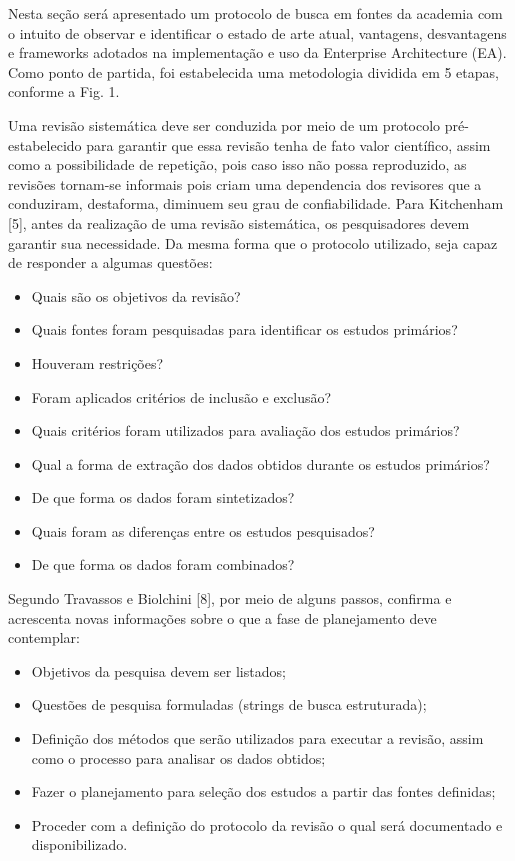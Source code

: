 Nesta seção será apresentado um protocolo de busca em fontes da academia com o intuito de observar e identificar o estado de arte atual, vantagens, desvantagens e frameworks adotados na implementação e uso da Enterprise Architecture (EA). Como ponto de partida, foi estabelecida uma metodologia dividida em 5 etapas, conforme a Fig. 1.


Uma revisão sistemática deve ser conduzida por meio de um protocolo pré-estabelecido para garantir que essa revisão tenha de fato valor científico, assim como a possibilidade de repetição, pois caso isso não possa reproduzido, as revisões tornam-se informais pois criam uma dependencia dos revisores que a conduziram, destaforma, diminuem seu grau de confiabilidade.
Para Kitchenham [5], antes da realização de uma revisão sistemática, os pesquisadores devem garantir sua necessidade. Da mesma forma que o protocolo utilizado, seja capaz de responder a algumas questões:

\begin{itemize}
    \item Quais são os objetivos da revisão?
    \item Quais fontes foram pesquisadas para identificar os estudos primários? 
    \item Houveram restrições?
    \item Foram aplicados critérios de inclusão e exclusão?
    \item Quais critérios foram utilizados para avaliação dos estudos primários?
    \item Qual a forma de extração dos dados obtidos durante os estudos primários?
    \item De que forma os dados foram sintetizados?
    \item Quais foram as diferenças entre os estudos pesquisados?
    \item De que forma os dados foram combinados?
\end{itemize}

Segundo Travassos e Biolchini [8], por meio de alguns passos, confirma e acrescenta novas informações sobre o que a fase de planejamento deve contemplar:

\begin{itemize}
    \item Objetivos da pesquisa devem ser listados;
    \item Questões de pesquisa formuladas (strings de busca estruturada);
    \item Definição dos métodos que serão utilizados para executar a revisão, assim como o processo para analisar os dados obtidos;
    \item Fazer o planejamento para seleção dos estudos a partir das fontes definidas;
    \item Proceder com a definição do protocolo da revisão o qual será documentado e disponibilizado.
\end{itemize}

